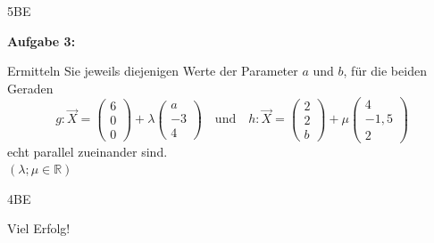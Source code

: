 \documentclass[a4paper,12pt]{article}
\newcommand{\Aufgabe}[1]{
  {
  \vspace*{0.5cm}
  \textsf{\textbf{Aufgabe #1}}
  \vspace*{0.2cm}
  
  }
}
\begin{document}
\begin{flushright}5BE \end{flushright}
\Aufgabe{3:}
Ermitteln Sie jeweils diejenigen Werte der Parameter $a$ und $b$, für die beiden Geraden
\[
  g: \vec{X} = \begin{pmatrix}6 \\ 0 \\ 0 \end{pmatrix} 
                     + \lambda \begin{pmatrix} a \\ -3 \\ 4 \end{pmatrix}
\quad \textrm{und} \quad
  h: \vec{X} = \begin{pmatrix}2 \\ 2 \\ b \end{pmatrix} 
                     + \mu \begin{pmatrix} 4 \\ -1,5 \\ 2 \end{pmatrix}
\]
echt parallel zueinander sind.\\
$
  (\lambda; \mu \in \mathbb{R})
$

\begin{flushright}4BE \end{flushright}



  \vspace{1cm}

\begin{center}Viel Erfolg! \end{center}







\end{document}
